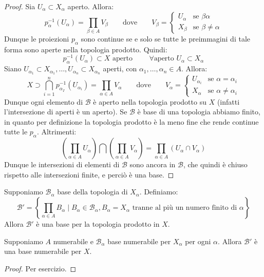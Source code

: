\begin{proof}
	Sia $U_\alpha \subset X_\alpha$ aperto. Allora:
	$$p_\alpha ^{-1} (U_\alpha)=\prod_{\beta \in A} V_\beta \qquad
	\text{dove}\qquad V_\beta =\begin{cases}U_\alpha & \text{se }\beta \alpha \\
	X_\beta & \text{se } \beta \ne \alpha \end{cases}$$
	Dunque le proiezioni $p_\alpha$ sono continue se e solo se tutte le
	preimmagini di tale forma sono aperte nella topologia prodotto.
    Quindi:
	$$p_\alpha ^{-1} (U_\alpha) \subset X \text{ aperto } \qquad \forall \text{
	aperto } U_\alpha \subset X_\alpha$$
	Siano $U_{\alpha _1} \subset X_{\alpha _1} , \dots , U_{\alpha _n} \subset
	X_{\alpha _n}$ aperti, con $\alpha _1, \dots, \alpha _n \in A$. Allora:
	$$X \supset \bigcap _{i=1}^n p_{\alpha _I}^{-1}(U_{\alpha _i}) = \prod
	_{\alpha \in A} V_\alpha \qquad \text{dove}\qquad V_\alpha =
	\begin{cases}U_{\alpha _i} & \text{se }\alpha =\alpha  _i \\ X_\alpha &
	\text{se } \alpha \ne \alpha _i \end{cases}$$
	Dunque ogni elemento di $\mathcal{B}$ è aperto nella topologia prodotto su
	$X$ (infatti l'intersezione di aperti è un aperto). Se $ \mathcal{B}$ è
	base di una topologia abbiamo finito, in quanto per definizione la topologia
	prodotto è la meno fine che rende continue tutte le $p_\alpha$.
	Altrimenti:
	$$\left( \prod_{\alpha \in A} U_\alpha \right) \bigcap \left( \prod_{\alpha
	\in A} V_\alpha \right)=\prod _{\alpha \in A} (U_\alpha \cap V_\alpha)$$
	Dunque le intersezioni di elementi di $\mathcal{B}$ sono ancora in
	$\mathcal{B}$, che quindi è chiuso rispetto alle intersezioni finite, e
	perciò è una base.
\end{proof}
\begin{oss}
	Supponiamo $\mathcal{B}_\alpha$ base della topologia di $X_\alpha$.
	Definiamo:
	$$\mathcal{B}'=\left \{ \prod_{\alpha \in A} B_\alpha \mid B_\alpha \in
	\mathcal{B}_\alpha, B_\alpha =X_\alpha \text{ tranne al più un numero
	finito di } \alpha \right \}$$
	Allora $\mathcal{B}'$ è una base per la topologia prodotto in $X$.
\end{oss}
\begin{cor}
	Supponiamo $A$ numerabile e $\mathcal{B}_\alpha$ base numerabile per
	$X_\alpha$ per ogni $\alpha$. Allora $\mathcal{B}'$ è una base numerabile
	per $X$.
\end{cor}
\begin{proof}
	Per esercizio.
\end{proof}
